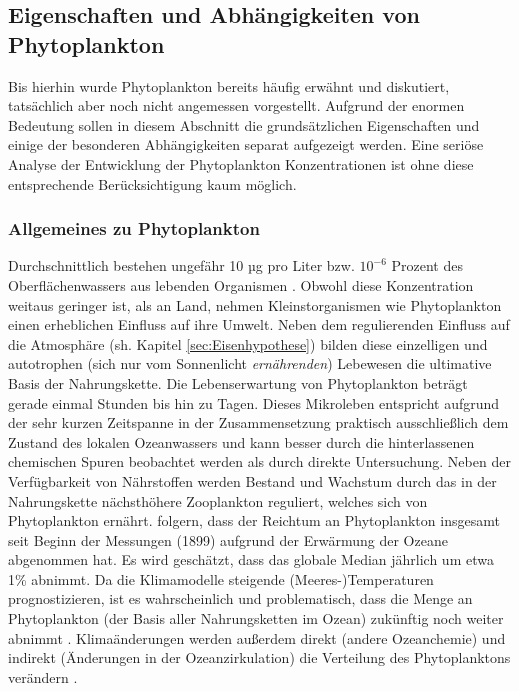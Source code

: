 \documentclass[12pt,a4paper,onecolumn]{scrartcl}
\begin{document}
\subsection{Eigenschaften und Abhängigkeiten von Phytoplankton} \label{sec:Phytoplankton}
Bis hierhin wurde Phytoplankton bereits häufig erwähnt und diskutiert, tatsächlich aber noch nicht angemessen vorgestellt. Aufgrund der enormen Bedeutung sollen in diesem Abschnitt die grundsätzlichen Eigenschaften und einige der besonderen Abhängigkeiten separat aufgezeigt werden. Eine seriöse Analyse der Entwicklung der Phytoplankton Konzentrationen ist ohne diese entsprechende Berücksichtigung kaum möglich. 
\subsubsection{Allgemeines zu Phytoplankton} \label{sec:Phytobasics}
Durchschnittlich  bestehen ungefähr 10 µg pro Liter bzw. $10^{-6}$ Prozent des Oberflächenwassers aus lebenden Organismen \citep{Emerson.2009}. Obwohl diese Konzentration weitaus geringer ist, als an Land, nehmen Kleinstorganismen wie Phytoplankton einen erheblichen Einfluss auf ihre Umwelt. Neben dem regulierenden Einfluss auf die Atmosphäre (sh. Kapitel \ref{sec:Eisenhypothese}) bilden diese einzelligen und autotrophen (sich nur vom Sonnenlicht \textit{ernährenden}) Lebewesen die ultimative Basis der Nahrungskette. Die Lebenserwartung von Phytoplankton beträgt gerade einmal Stunden bis hin zu Tagen. Dieses Mikroleben entspricht aufgrund der sehr kurzen Zeitspanne in der Zusammensetzung praktisch ausschließlich dem Zustand des lokalen Ozeanwassers und kann besser durch die hinterlassenen chemischen Spuren beobachtet werden als durch direkte Untersuchung. Neben der Verfügbarkeit von Nährstoffen werden Bestand und Wachstum durch das in der Nahrungskette nächsthöhere Zooplankton reguliert, welches sich von Phytoplankton ernährt. \citet{Boyce.2010} folgern, dass der Reichtum an Phytoplankton insgesamt seit Beginn der Messungen (1899) aufgrund der Erwärmung der Ozeane abgenommen hat. Es wird geschätzt, dass das globale Median jährlich um etwa 1\% abnimmt. Da die Klimamodelle steigende (Meeres-)Temperaturen prognostizieren, ist es wahrscheinlich und problematisch, dass die Menge an Phytoplankton (der Basis aller Nahrungsketten im Ozean) zukünftig noch weiter abnimmt \citep{Siegel.2010}. Klimaänderungen werden außerdem direkt (andere Ozeanchemie) und indirekt (Änderungen in der Ozeanzirkulation) die Verteilung des Phytoplanktons verändern \citep{Falkowski.1998}.  
\end{document}
